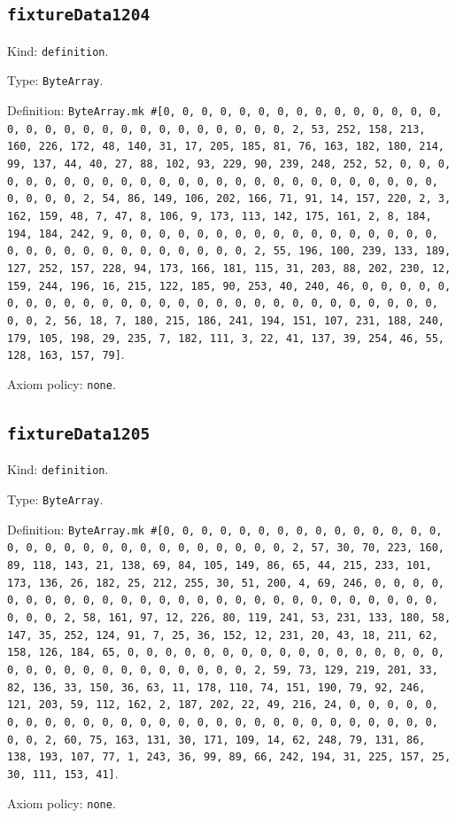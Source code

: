 \documentclass[11pt]{article}
\begin{document}
\subsection*{\texttt{fixtureData1204}}
\noindent Kind: \texttt{definition}.\par
\noindent Type: \texttt{ByteArray}.\par
\noindent Definition: \texttt{ByteArray.mk \#[0, 0, 0, 0, 0, 0, 0, 0, 0, 0, 0, 0, 0, 0, 0, 0, 0, 0, 0, 0, 0, 0, 0, 0, 0, 0, 0, 0, 0, 0, 2, 53, 252, 158, 213, 160, 226, 172, 48, 140, 31, 17, 205, 185, 81, 76, 163, 182, 180, 214, 99, 137, 44, 40, 27, 88, 102, 93, 229, 90, 239, 248, 252, 52, 0, 0, 0, 0, 0, 0, 0, 0, 0, 0, 0, 0, 0, 0, 0, 0, 0, 0, 0, 0, 0, 0, 0, 0, 0, 0, 0, 0, 0, 0, 2, 54, 86, 149, 106, 202, 166, 71, 91, 14, 157, 220, 2, 3, 162, 159, 48, 7, 47, 8, 106, 9, 173, 113, 142, 175, 161, 2, 8, 184, 194, 184, 242, 9, 0, 0, 0, 0, 0, 0, 0, 0, 0, 0, 0, 0, 0, 0, 0, 0, 0, 0, 0, 0, 0, 0, 0, 0, 0, 0, 0, 0, 0, 0, 2, 55, 196, 100, 239, 133, 189, 127, 252, 157, 228, 94, 173, 166, 181, 115, 31, 203, 88, 202, 230, 12, 159, 244, 196, 16, 215, 122, 185, 90, 253, 40, 240, 46, 0, 0, 0, 0, 0, 0, 0, 0, 0, 0, 0, 0, 0, 0, 0, 0, 0, 0, 0, 0, 0, 0, 0, 0, 0, 0, 0, 0, 0, 0, 2, 56, 18, 7, 180, 215, 186, 241, 194, 151, 107, 231, 188, 240, 179, 105, 198, 29, 235, 7, 182, 111, 3, 22, 41, 137, 39, 254, 46, 55, 128, 163, 157, 79]}.\par
\noindent Axiom policy: \texttt{none}.\par
\subsection*{\texttt{fixtureData1205}}
\noindent Kind: \texttt{definition}.\par
\noindent Type: \texttt{ByteArray}.\par
\noindent Definition: \texttt{ByteArray.mk \#[0, 0, 0, 0, 0, 0, 0, 0, 0, 0, 0, 0, 0, 0, 0, 0, 0, 0, 0, 0, 0, 0, 0, 0, 0, 0, 0, 0, 0, 0, 2, 57, 30, 70, 223, 160, 89, 118, 143, 21, 138, 69, 84, 105, 149, 86, 65, 44, 215, 233, 101, 173, 136, 26, 182, 25, 212, 255, 30, 51, 200, 4, 69, 246, 0, 0, 0, 0, 0, 0, 0, 0, 0, 0, 0, 0, 0, 0, 0, 0, 0, 0, 0, 0, 0, 0, 0, 0, 0, 0, 0, 0, 0, 0, 2, 58, 161, 97, 12, 226, 80, 119, 241, 53, 231, 133, 180, 58, 147, 35, 252, 124, 91, 7, 25, 36, 152, 12, 231, 20, 43, 18, 211, 62, 158, 126, 184, 65, 0, 0, 0, 0, 0, 0, 0, 0, 0, 0, 0, 0, 0, 0, 0, 0, 0, 0, 0, 0, 0, 0, 0, 0, 0, 0, 0, 0, 0, 0, 2, 59, 73, 129, 219, 201, 33, 82, 136, 33, 150, 36, 63, 11, 178, 110, 74, 151, 190, 79, 92, 246, 121, 203, 59, 112, 162, 2, 187, 202, 22, 49, 216, 24, 0, 0, 0, 0, 0, 0, 0, 0, 0, 0, 0, 0, 0, 0, 0, 0, 0, 0, 0, 0, 0, 0, 0, 0, 0, 0, 0, 0, 0, 0, 2, 60, 75, 163, 131, 30, 171, 109, 14, 62, 248, 79, 131, 86, 138, 193, 107, 77, 1, 243, 36, 99, 89, 66, 242, 194, 31, 225, 157, 25, 30, 111, 153, 41]}.\par
\noindent Axiom policy: \texttt{none}.\par
\end{document}
